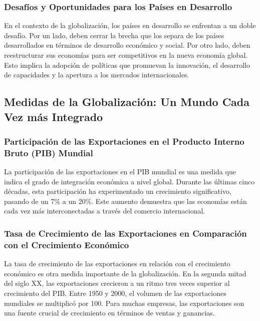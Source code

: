 \documentclass[
  a4paper,
]{article}
\begin{document}
\subsubsection{Desafíos y Oportunidades para los Países en
Desarrollo}\label{desafuxedos-y-oportunidades-para-los-pauxedses-en-desarrollo}

En el contexto de la globalización, los países en desarrollo se
enfrentan a un doble desafío. Por un lado, deben cerrar la brecha que
los separa de los países desarrollados en términos de desarrollo
económico y social. Por otro lado, deben reestructurar sus economías
para ser competitivos en la nueva economía global. Esto implica la
adopción de políticas que promuevan la innovación, el desarrollo de
capacidades y la apertura a los mercados internacionales.

\subsection{Medidas de la Globalización: Un Mundo Cada Vez más
Integrado}\label{medidas-de-la-globalizaciuxf3n-un-mundo-cada-vez-muxe1s-integrado}

\subsubsection{Participación de las Exportaciones en el Producto Interno
Bruto (PIB)
Mundial}\label{participaciuxf3n-de-las-exportaciones-en-el-producto-interno-bruto-pib-mundial}

La participación de las exportaciones en el PIB mundial es una medida
que indica el grado de integración económica a nivel global. Durante las
últimas cinco décadas, esta participación ha experimentado un
crecimiento significativo, pasando de un 7\% a un 20\%. Este aumento
demuestra que las economías están cada vez más interconectadas a través
del comercio internacional.

\subsubsection{Tasa de Crecimiento de las Exportaciones en Comparación
con el Crecimiento
Económico}\label{tasa-de-crecimiento-de-las-exportaciones-en-comparaciuxf3n-con-el-crecimiento-econuxf3mico}

La tasa de crecimiento de las exportaciones en relación con el
crecimiento económico es otra medida importante de la globalización. En
la segunda mitad del siglo XX, las exportaciones crecieron a un ritmo
tres veces superior al crecimiento del PIB. Entre 1950 y 2000, el
volumen de las exportaciones mundiales se multiplicó por 100. Para
muchas empresas, las exportaciones son una fuente crucial de crecimiento
en términos de ventas y ganancias.
\end{document}
